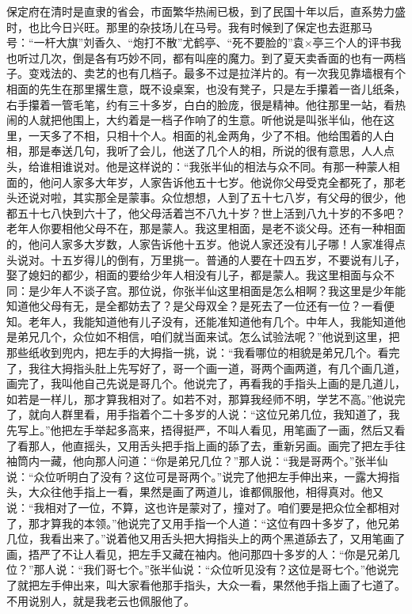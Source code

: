 \documentclass[12pt,UTF8]{ctexbook}
\begin{document}
保定府在清时是直隶的省会，市面繁华热闹已极，到了民国十年以后，直系势力盛时，也比今日兴旺。那里的杂技场儿在马号。我有时候到了保定也去逛那马号：“一杆大旗”刘香久、“炮打不散”尤鹤亭、“死不要脸的”袁×亭三个人的评书我也听过几次，倒是各有巧妙不同，都有叫座的魔力。到了夏天卖香面的也有一两档子。变戏法的、卖艺的也有几档子。最多不过是拉洋片的。有一次我见靠墙根有个相面的先生在那里撂生意，既不设桌案，也没有凳子，只是左手攥着一沓儿纸条，右手攥着一管毛笔，约有三十多岁，白白的脸庞，很是精神。他往那里一站，看热闹的人就把他围上，大约着是一档子作响了的生意。听他说是叫张半仙，他在这里，一天多了不相，只相十个人。相面的礼金两角，少了不相。他给围着的人白相，那是奉送几句，我听了会儿，他送了几个人的相，所说的很有意思，人人点头，给谁相谁说对。他是这样说的：“我张半仙的相法与众不同。有那一种蒙人相面的，他问人家多大年岁，人家告诉他五十七岁。他说你父母受克全都死了，那老头还说对啦，其实那全是蒙事。众位想想，人到了五十七八岁，有父母的很少，他都五十七八快到六十了，他父母活着岂不八九十岁？世上活到八九十岁的不多吧？老年人你要相他父母不在，那是蒙人。我这里相面，是老不谈父母。还有一种相面的，他问人家多大岁数，人家告诉他十五岁。他说人家还没有儿子哪！人家准得点头说对。十五岁得儿的倒有，万里挑一。普通的人要在十四五岁，不要说有儿子，娶了媳妇的都少，相面的要给少年人相没有儿子，都是蒙人。我这里相面与众不同：是少年人不谈子宫。那位说，你张半仙这里相面是怎么相啊？我这里是少年能知道他父母有无，是全都妨去了？是父母双全？是死去了一位还有一位？一看便知。老年人，我能知道他有儿子没有，还能准知道他有几个。中年人，我能知道他是弟兄几个，众位如不相信，咱们就当面来试。怎么试验法呢？”他说到这里，把那些纸收到兜内，把左手的大拇指一挑，说：“我看哪位的相貌是弟兄几个。看完了，我往大拇指头肚上先写好了，哥一个画一道，哥两个画两道，有几个画几道，画完了，我叫他自己先说是哥几个。他说完了，再看我的手指头上画的是几道儿，如若是一样儿，那才算我相对了。如若不对，那算我经师不明，学艺不高。”他说完了，就向人群里看，用手指着个二十多岁的人说：“这位兄弟几位，我知道了，我先写上。”他把左手举起多高来，捂得挺严，不叫人看见，用笔画了一画，然后又看了看那人，他直摇头，又用舌头把手指上画的舔了去，重新另画。画完了把左手往袖筒内一藏，他向那人问道：“你是弟兄几位？”那人说：“我是哥两个。”张半仙说：“众位听明白了没有？这位可是哥两个。”说完了他把左手伸出来，一露大拇指头，大众往他手指上一看，果然是画了两道儿，谁都佩服他，相得真对。他又说：“我相对了一位，不算，这也许是蒙对了，撞对了。咱们要是把众位全都相对了，那才算我的本领。”他说完了又用手指一个人道：“这位有四十多岁了，他兄弟几位，我看出来了。”说着他又用舌头把大拇指头上的两个黑道舔去了，又用笔画了画，捂严了不让人看见，把左手又藏在袖内。他问那四十多岁的人：“你是兄弟几位？”那人说：“我们哥七个。”张半仙说：“众位听见没有？这位是哥七个。”他说完了就把左手伸出来，叫大家看他那手指头，大众一看，果然他手指上画了七道了。不用说别人，就是我老云也佩服他了。
\end{document}
